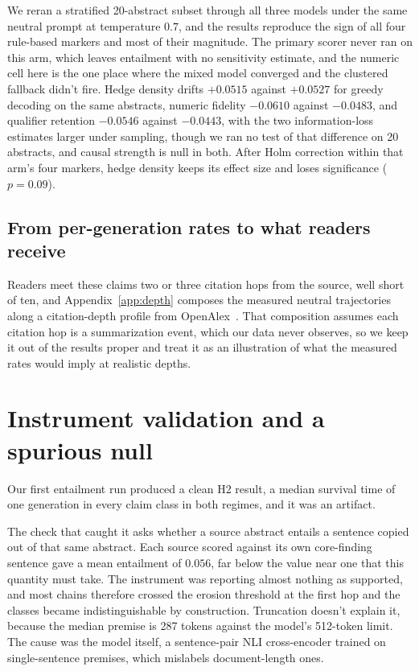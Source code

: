 \documentclass{article}
\begin{document}
We reran a stratified 20-abstract subset through all three models under the same neutral prompt at temperature $0.7$, and the results reproduce the sign of all four rule-based markers and most of their magnitude. The primary scorer never ran on this arm, which leaves entailment with no sensitivity estimate, and the numeric cell here is the one place where the mixed model converged and the clustered fallback didn't fire. Hedge density drifts $+0.0515$ against $+0.0527$ for greedy decoding on the same abstracts, numeric fidelity $-0.0610$ against $-0.0483$, and qualifier retention $-0.0546$ against $-0.0443$, with the two information-loss estimates larger under sampling, though we ran no test of that difference on 20 abstracts, and causal strength is null in both. After Holm correction within that arm's four markers, hedge density keeps its effect size and loses significance ($p = 0.09$).

\subsection{From per-generation rates to what readers receive}
Readers meet these claims two or three citation hops from the source, well short of ten, and Appendix~\ref{app:depth} composes the measured neutral trajectories along a citation-depth profile from OpenAlex~\citep{priem2022openalex}. That composition assumes each citation hop is a summarization event, which our data never observes, so we keep it out of the results proper and treat it as an illustration of what the measured rates would imply at realistic depths.

\section{Instrument validation and a spurious null}
\label{sec:validation}

Our first entailment run produced a clean H2 result, a median survival time of one generation in every claim class in both regimes, and it was an artifact.

The check that caught it asks whether a source abstract entails a sentence copied out of that same abstract. Each source scored against its own core-finding sentence gave a mean entailment of $0.056$, far below the value near one that this quantity must take. The instrument was reporting almost nothing as supported, and most chains therefore crossed the erosion threshold at the first hop and the classes became indistinguishable by construction. Truncation doesn't explain it, because the median premise is 287 tokens against the model's 512-token limit. The cause was the model itself, a sentence-pair NLI cross-encoder trained on single-sentence premises, which mislabels document-length ones.
\end{document}

